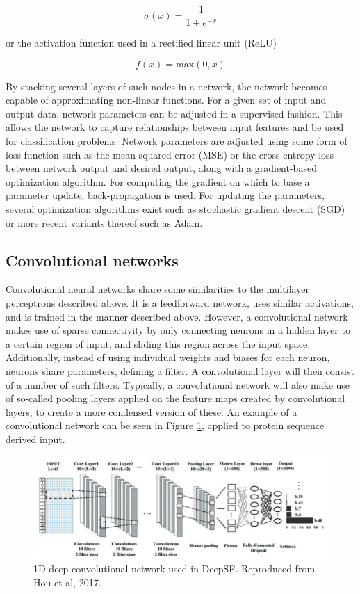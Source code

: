 \begin{equation}
\sigma(x) = \frac{1}{1 + e^{-x}}  
\end{equation}

or the activation function used in a rectified linear unit (ReLU)

\begin{equation}
f(x) = \textrm{max}(0,x)  
\end{equation}

By stacking several layers of such nodes in a network, the network becomes capable of approximating non-linear functions. For a given set of input and output data, network parameters can be adjusted in a supervised fashion. This allows the network to capture relationships between input features and be used for classification problems. Network parameters are adjusted using some form of loss function such as the mean squared error (MSE) or the cross-entropy loss between network output and desired output, along with a gradient-based optimization algorithm. For computing the gradient on which to base a parameter update, back-propagation is used. For updating the parameters, several optimization algorithms exist such as stochastic gradient descent (SGD) or more recent variants thereof such as Adam.\cite{kingma2014adam}

\subsection{Convolutional networks}

Convolutional neural networks share some similarities to the multilayer perceptrons described above. It is a feedforward network, uses similar activations, and is trained in the manner described above. However, a convolutional network makes use of sparse connectivity by only connecting neurons in a hidden layer to a certain region of input, and sliding this region across the input space. Additionally, instead of using individual weights and biases for each neuron, neurons share parameters, defining a filter. A convolutional layer will then consist of a number of such filters. Typically, a convolutional network will also make use of so-called pooling layers applied on the feature maps created by convolutional layers, to create a more condensed version of these.
An example of a convolutional network can be seen in Figure \ref{fig:deepsf}, applied to protein sequence derived input.

\begin{figure}
  \centering
  \includegraphics[scale=0.4]
    {DeepSF_model_2.png}
  \centering
  \caption{ 1D deep convolutional network used in DeepSF. Reproduced from Hou et al, 2017.\cite{hou2017deepsf} }
  \label{fig:deepsf}
\end{figure}

